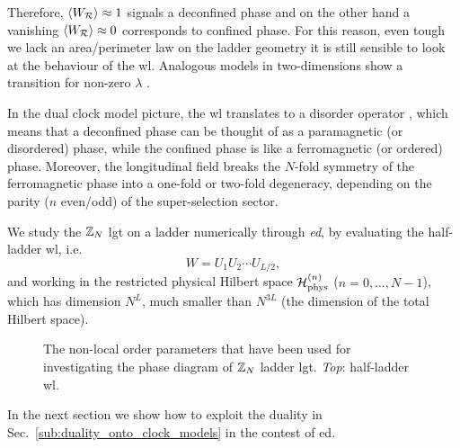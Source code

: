 Therefore, $\ev{W_{\mathcal{R}}} \approx 1$ signals a deconfined phase and on the other hand a vanishing $\ev{W_{\mathcal{R}}} \approx 0$ corresponds to confined phase.
For this reason, even tough we lack an area/perimeter law on the ladder geometry it is still sensible to look at the behaviour of the \ac{wl}.
Analogous models in two-dimensions show a transition for non-zero $\lambda$ \cite{trebst2007topological, hamma2008adiabatic, tagliacozzo2011entanglement}.


In the dual clock model picture, the \ac{wl} translates to a disorder operator \cite{fradkin1978order}, which means that a deconfined phase can be thought of as a paramagnetic (or disordered) phase, while the confined phase is like a ferromagnetic (or ordered) phase.
Moreover, the longitudinal field breaks the $N$-fold symmetry of the ferromagnetic phase into a one-fold or two-fold degeneracy, depending on the parity ($n$ even/odd) of the super-selection sector.



We study the $\mathbb{Z}_N$ \ac{lgt} on a ladder numerically through \emph{\ac{ed}}, by evaluating the half-ladder \ac{wl}, i.e.~
\begin{equation}
    W = U_1 U_2 \cdots U_{L/2},
\end{equation}
and working in the restricted physical Hilbert space $\mathcal{H}_{\text{phys}}^{(n)}$ ($n=0,\dots,N-1$), which has dimension $N^L$, much smaller than $N^{3L}$ (the dimension of the total Hilbert space).


\begin{figure}[t]
    \centering
    
    \caption[Non-local order parameters on the ladder]{The non-local order parameters that have been used for investigating the phase diagram of $\mathbb{Z}_N$ ladder \ac{lgt}.
    \emph{Top}: half-ladder \ac{wl}.
    }%
    \label{fig:nlop_ladder}
\end{figure}


In the next section we show how to exploit the duality in Sec.~\ref{sub:duality_onto_clock_models} in the contest of \ac{ed}.
